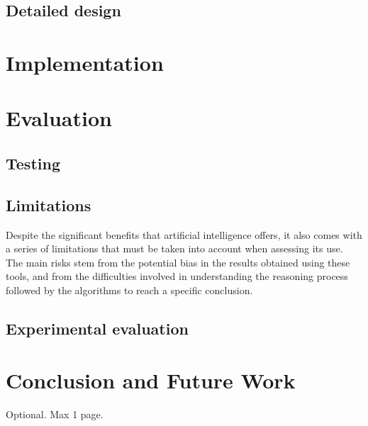 \documentclass[12pt,a4paper,openright,twoside]{book}
\begin{document}
\section{Detailed design}

\chapter{Implementation}
\label{chap:implementation}

\chapter{Evaluation}
\label{chap:evaluation}
\section{Testing}
\section{Limitations}
Despite the significant benefits that artificial intelligence offers, it also comes with a series of limitations that must be taken into account when assessing its use. The main risks stem from the potential bias in the results obtained using these tools, and from the difficulties involved in understanding the reasoning process followed by the algorithms to reach a specific conclusion.\cite{fernandez2019artificial}

\section{Experimental evaluation}

\chapter{Conclusion and Future Work}
\label{chap:conclusion}

\backmatter




\begin{acknowledgements} %
Optional. Max 1 page.
\end{acknowledgements}
\end{document}
